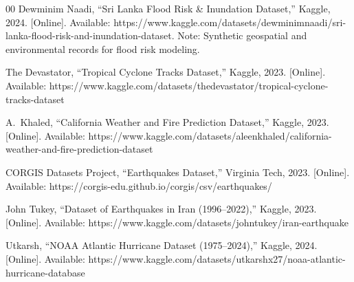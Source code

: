 \documentclass[journal]{IEEEtran}
\begin{document}
\begin{thebibliography}{00}
Dewminim Naadi, ``Sri Lanka Flood Risk \& Inundation Dataset,'' Kaggle, 2024. [Online]. Available: https://www.kaggle.com/datasets/dewminimnaadi/sri-lanka-flood-risk-and-inundation-dataset. Note: Synthetic geospatial and environmental records for flood risk modeling.

The Devastator, ``Tropical Cyclone Tracks Dataset,'' Kaggle, 2023. [Online]. Available: https://www.kaggle.com/datasets/thedevastator/tropical-cyclone-tracks-dataset

A.~Khaled, ``California Weather and Fire Prediction Dataset,'' Kaggle, 2023. [Online]. Available: https://www.kaggle.com/datasets/aleenkhaled/california-weather-and-fire-prediction-dataset

CORGIS Datasets Project, ``Earthquakes Dataset,'' Virginia Tech, 2023. [Online]. Available: https://corgis-edu.github.io/corgis/csv/earthquakes/

John Tukey, ``Dataset of Earthquakes in Iran (1996--2022),'' Kaggle, 2023. [Online]. Available: https://www.kaggle.com/datasets/johntukey/iran-earthquake

Utkarsh, ``NOAA Atlantic Hurricane Dataset (1975--2024),'' Kaggle, 2024. [Online]. Available: https://www.kaggle.com/datasets/utkarshx27/noaa-atlantic-hurricane-database

\end{thebibliography}
\end{document}

